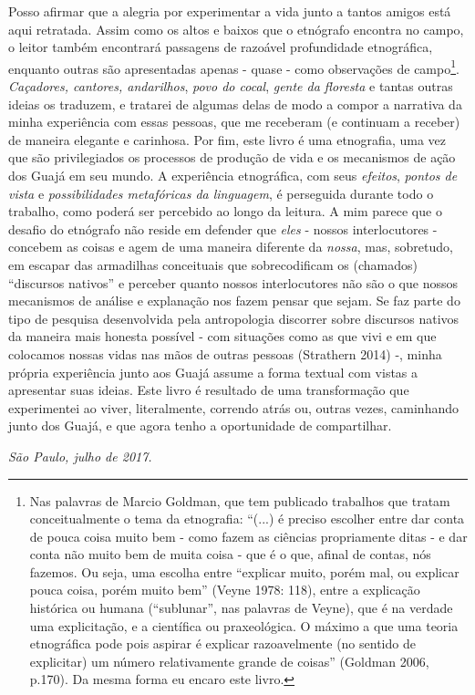 Posso afirmar que a alegria por experimentar a vida junto a tantos
amigos está aqui retratada. Assim como os altos e baixos que o etnógrafo
encontra no campo, o leitor também encontrará passagens de razoável
profundidade etnográfica, enquanto outras são apresentadas apenas -
quase - como observações de campo\footnote{Nas palavras de Marcio
  Goldman, que tem publicado trabalhos que tratam conceitualmente o tema
  da etnografia: ``(...) é preciso escolher entre dar conta de pouca
  coisa muito bem - como fazem as ciências propriamente ditas - e dar
  conta não muito bem de muita coisa - que é o que, afinal de contas,
  nós fazemos. Ou seja, uma escolha entre ``explicar muito, porém mal,
  ou explicar pouca coisa, porém muito bem'' (Veyne 1978: 118), entre a
  explicação histórica ou humana (``sublunar'', nas palavras de Veyne),
  que é na verdade uma explicitação, e a científica ou praxeológica. O
  máximo a que uma teoria etnográfica pode pois aspirar é explicar
  razoavelmente (no sentido de explicitar) um número relativamente
  grande de coisas'' (Goldman 2006, p.170). Da mesma forma eu encaro
  este livro.}. \emph{Caçadores, cantores, andarilhos}, \emph{povo do
cocal}, \emph{gente da floresta} e tantas outras ideias os traduzem, e
tratarei de algumas delas de modo a compor a narrativa da minha
experiência com essas pessoas, que me receberam (e continuam a receber)
de maneira elegante e carinhosa. Por fim, este livro é uma etnografia,
uma vez que são privilegiados os processos de produção de vida e os
mecanismos de ação dos Guajá em seu mundo. A experiência
etnográfica, com seus \emph{efeitos}, \emph{pontos de vista} e
\emph{possibilidades metafóricas da linguagem}, é perseguida durante
todo o trabalho, como poderá ser percebido ao longo da leitura. A mim
parece que o desafio do etnógrafo não reside em defender que \emph{eles}
- nossos interlocutores - concebem as coisas e agem de uma maneira
diferente da \emph{nossa}, mas, sobretudo, em escapar das armadilhas
conceituais que sobrecodificam os (chamados) ``discursos nativos'' e
perceber quanto nossos interlocutores não são o que nossos mecanismos de
análise e explanação nos fazem pensar que sejam. Se faz parte do tipo de
pesquisa desenvolvida pela antropologia discorrer sobre discursos
nativos da maneira mais honesta possível - com situações como as que
vivi e em que colocamos nossas vidas nas mãos de outras pessoas
(Strathern 2014) -, minha própria experiência junto aos Guajá assume a
forma textual com vistas a apresentar suas ideias. Este livro é
resultado de uma transformação que experimentei ao viver, literalmente,
correndo atrás ou, outras vezes, caminhando junto dos Guajá, e que agora
tenho a oportunidade de compartilhar.

\medskip
\begin{flushright}
\emph{São Paulo, julho de 2017.}
\end{flushright}

